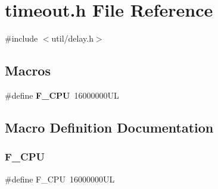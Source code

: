 \section{timeout.\+h File Reference}
\label{timeout_8h}
{\ttfamily \#include $<$util/delay.\+h$>$}\newline
\subsection*{Macros}
\begin{DoxyCompactItemize}
\item 
\#define \textbf{ F\+\_\+\+C\+PU}~16000000\+UL
\end{DoxyCompactItemize}


\subsection{Macro Definition Documentation}
\mbox{\label{timeout_8h_a43bafb28b29491ec7f871319b5a3b2f8}} 
\subsubsection{F\+\_\+\+C\+PU}
{\footnotesize\ttfamily \#define F\+\_\+\+C\+PU~16000000\+UL}

